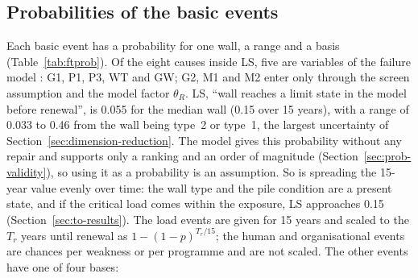 \subsection{Probabilities of the basic events}\label{sec:ft-probabilities}

Each basic event has a probability for one wall, a range and a basis
(Table~\ref{tab:ftprob}). Of the eight causes inside LS, five are variables of the failure model \parencite{hemel2023,hemel2024}: G1, P1, P3, WT and GW; G2, M1 and M2 enter only through the screen assumption and the model factor $\theta_R$. LS, ``wall reaches a limit state in the model before renewal'', is 0.055 for the median wall (0.15 over 15 years), with a range of 0.033 to 0.46 from the wall being
type~2 or type~1, the largest uncertainty of Section~\ref{sec:dimension-reduction}. The model gives this probability without any
repair and supports only a ranking and an order of magnitude
(Section~\ref{sec:prob-validity}), so using it as a probability is an
assumption. So is spreading the 15-year value evenly over time: the wall type
and the pile condition are a present state, and if the critical load comes
within the exposure, LS approaches 0.15 (Section~\ref{sec:to-results}). The load events are given for 15 years and scaled to the $T_r$ years
until renewal as $1-(1-p)^{T_r/15}$; the human and organisational events are
chances per weakness or per programme and are not scaled. The other events have
one of four bases:
